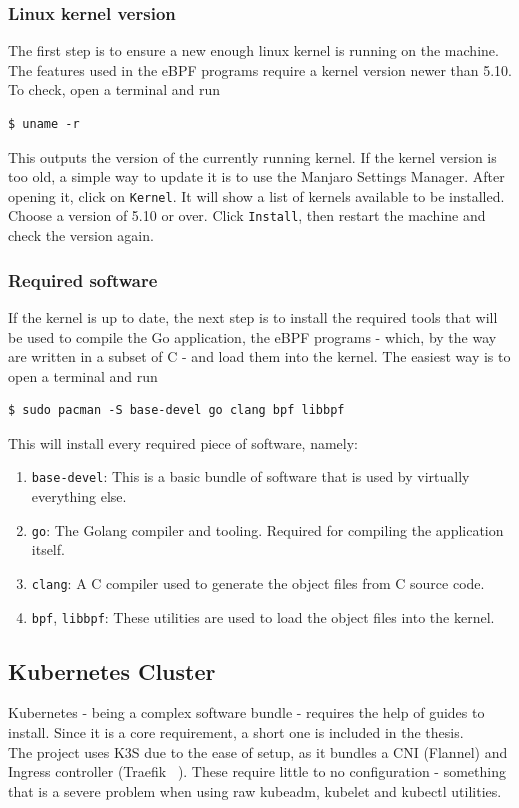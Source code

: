 \subsubsection{Linux kernel version}
The first step is to ensure a new enough linux kernel is running on the machine. The features used in the eBPF programs require a kernel version newer than 5.10. To check, open a terminal and run
\begin{verbatim}
$ uname -r 
\end{verbatim}
This outputs the version of the currently running kernel. If the kernel version is too old, a simple way to update it is to use the Manjaro Settings Manager. After opening it, click on \texttt{Kernel}. It will show a list of kernels available to be installed. Choose a version of 5.10 or over. Click \texttt{Install}, then restart the machine and check the version again.

\subsubsection{Required software}
If the kernel is up to date, the next step is to install the required tools that will be used to compile the Go application, the eBPF programs - which, by the way are written in a subset of C - and load them into the kernel. The easiest way is to open a terminal and run
\begin{verbatim}
$ sudo pacman -S base-devel go clang bpf libbpf
\end{verbatim}
\noindent
This will install every required piece of software, namely:
\begin{enumerate}
    \item \texttt{base-devel}: This is a basic bundle of software that is used by virtually everything else.
    \item \texttt{go}: The Golang compiler and tooling. Required for compiling the application itself.
    \item \texttt{clang}: A C compiler used to generate the object files from C source code.
    \item \texttt{bpf}, \texttt{libbpf}: These utilities are used to load the object files into the kernel.
\end{enumerate}


\subsection{Kubernetes Cluster}
Kubernetes - being a complex software bundle - requires the help of guides to install. Since it is a core requirement, a short one is included in the thesis.\\
The project uses K3S due to the ease of setup, as it bundles a CNI (Flannel) and Ingress controller (Traefik ~\cite{traefik}). These require little to no configuration - something that is a severe problem when using raw kubeadm, kubelet and kubectl utilities.

